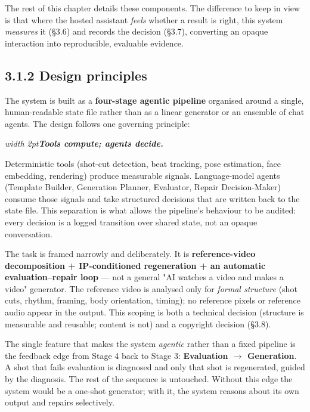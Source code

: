 \documentclass[10pt,twocolumn,letterpaper]{article}
\newenvironment{quotebox}%
 {\par\vspace{3pt}\noindent\begin{list}{}{\setlength{\leftmargin}{1em}\setlength{\rightmargin}{0.5em}}\item\footnotesize\itshape\color{black!80}\hspace*{-0.6em}\vrule width 2pt\hspace{0.6em}\ignorespaces}%
 {\end{list}\vspace{3pt}}
\begin{document}
The rest of this chapter details these components. The difference to keep in view is that where the hosted assistant \emph{feels} whether a result is right, this system \emph{measures} it (\S{}3.6) and records the decision (\S{}3.7), converting an opaque interaction into reproducible, evaluable evidence.

\subsection*{3.1.2 Design principles}

The system is built as a \textbf{four-stage agentic pipeline} organised around a single, human-readable state file rather than as a linear generator or an ensemble of chat agents. The design follows one governing principle:

\begin{quotebox}\textbf{Tools compute; agents decide.}\end{quotebox}

Deterministic tools (shot-cut detection, beat tracking, pose estimation, face embedding, rendering) produce measurable signals. Language-model agents (Template Builder, Generation Planner, Evaluator, Repair Decision-Maker) consume those signals and take structured decisions that are written back to the state file. This separation is what allows the pipeline's behaviour to be audited: every decision is a logged transition over shared state, not an opaque conversation.

The task is framed narrowly and deliberately. It is \textbf{reference-video decomposition + IP-conditioned regeneration + an automatic evaluation--repair loop} --- not a general "AI watches a video and makes a video" generator. The reference video is analysed only for \emph{formal structure} (shot cuts, rhythm, framing, body orientation, timing); no reference pixels or reference audio appear in the output. This scoping is both a technical decision (structure is measurable and reusable; content is not) and a copyright decision (\S{}3.8).

The single feature that makes the system \emph{agentic} rather than a fixed pipeline is the feedback edge from Stage 4 back to Stage 3: \textbf{Evaluation $\rightarrow$ Generation}. A shot that fails evaluation is diagnosed and only that shot is regenerated, guided by the diagnosis. The rest of the sequence is untouched. Without this edge the system would be a one-shot generator; with it, the system reasons about its own output and repairs selectively.
\end{document}
